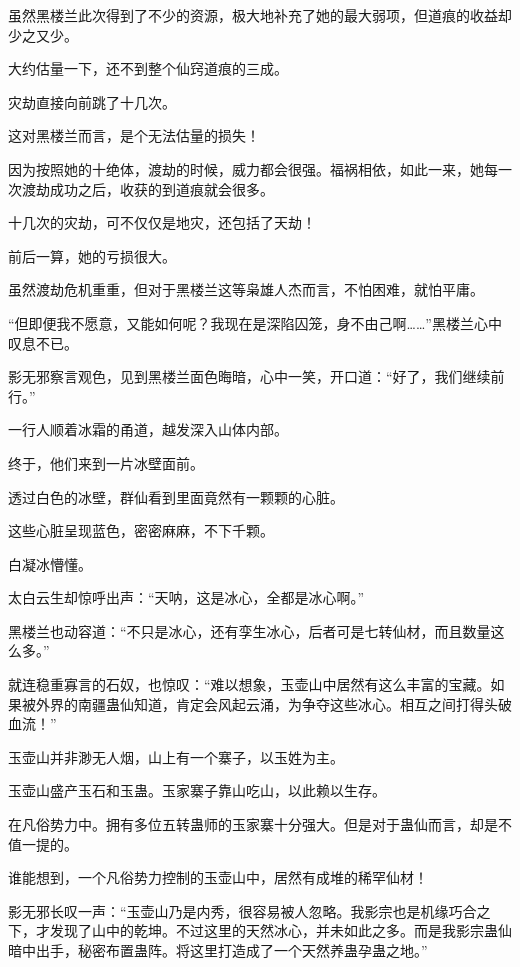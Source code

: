 
\begin{this_body}



虽然黑楼兰此次得到了不少的资源，极大地补充了她的最大弱项，但道痕的收益却少之又少。

大约估量一下，还不到整个仙窍道痕的三成。

灾劫直接向前跳了十几次。

这对黑楼兰而言，是个无法估量的损失！

因为按照她的十绝体，渡劫的时候，威力都会很强。福祸相依，如此一来，她每一次渡劫成功之后，收获的到道痕就会很多。

十几次的灾劫，可不仅仅是地灾，还包括了天劫！

前后一算，她的亏损很大。

虽然渡劫危机重重，但对于黑楼兰这等枭雄人杰而言，不怕困难，就怕平庸。

“但即便我不愿意，又能如何呢？我现在是深陷囚笼，身不由己啊……”黑楼兰心中叹息不已。

影无邪察言观色，见到黑楼兰面色晦暗，心中一笑，开口道：“好了，我们继续前行。”

一行人顺着冰霜的甬道，越发深入山体内部。

终于，他们来到一片冰壁面前。

透过白色的冰壁，群仙看到里面竟然有一颗颗的心脏。

这些心脏呈现蓝色，密密麻麻，不下千颗。

白凝冰懵懂。

太白云生却惊呼出声：“天呐，这是冰心，全都是冰心啊。”

黑楼兰也动容道：“不只是冰心，还有孪生冰心，后者可是七转仙材，而且数量这么多。”

就连稳重寡言的石奴，也惊叹：“难以想象，玉壶山中居然有这么丰富的宝藏。如果被外界的南疆蛊仙知道，肯定会风起云涌，为争夺这些冰心。相互之间打得头破血流！”

玉壶山并非渺无人烟，山上有一个寨子，以玉姓为主。

玉壶山盛产玉石和玉蛊。玉家寨子靠山吃山，以此赖以生存。

在凡俗势力中。拥有多位五转蛊师的玉家寨十分强大。但是对于蛊仙而言，却是不值一提的。

谁能想到，一个凡俗势力控制的玉壶山中，居然有成堆的稀罕仙材！

影无邪长叹一声：“玉壶山乃是内秀，很容易被人忽略。我影宗也是机缘巧合之下，才发现了山中的乾坤。不过这里的天然冰心，并未如此之多。而是我影宗蛊仙暗中出手，秘密布置蛊阵。将这里打造成了一个天然养蛊孕蛊之地。”


\end{this_body}
